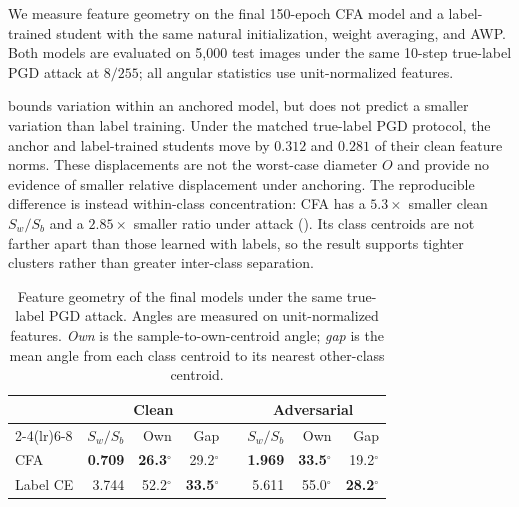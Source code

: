 \documentclass{article} %
\theoremstyle{plain}
\begin{document}
We measure feature geometry on the final 150-epoch CFA model and a label-trained student with the
same natural initialization, weight averaging, and AWP. Both models are evaluated on 5,000 test
images under the same 10-step true-label PGD attack at $8/255$; all angular statistics use
unit-normalized features.

 bounds variation within an anchored model, but does not predict a smaller
variation than label training. Under the matched true-label PGD protocol, the anchor and
label-trained students move by $0.312$ and $0.281$ of their clean feature norms. These
displacements are not the worst-case diameter $O$ and provide no evidence of smaller relative
displacement under anchoring. The reproducible difference is instead within-class concentration:
CFA has a $5.3\times$ smaller clean $S_w/S_b$ and a $2.85\times$ smaller ratio under attack
(). Its class centroids are not farther apart than those learned with labels,
so the result supports tighter clusters rather than greater inter-class separation.

\begin{table}[!htbp]
  \centering \small \setlength{\tabcolsep}{4pt}
  \caption{Feature geometry of the final models under the same true-label PGD attack. Angles are
  measured on unit-normalized features. \emph{Own} is the
  sample-to-own-centroid angle; \emph{gap} is the mean angle from each class centroid to its
  nearest other-class centroid.}
  \label{tab:anchorgeometry}
  \begin{tabular}{lrrrcrrr}
    \toprule
    & \multicolumn{3}{c}{Clean} & & \multicolumn{3}{c}{Adversarial} \\
    \cmidrule(lr){2-4}\cmidrule(lr){6-8}
    & $S_w/S_b$ & Own & Gap & & $S_w/S_b$ & Own & Gap \\
    \midrule
    CFA & \textbf{0.709} & \textbf{26.3$^\circ$} & 29.2$^\circ$ && \textbf{1.969} & \textbf{33.5$^\circ$} & 19.2$^\circ$ \\
    Label CE & 3.744 & 52.2$^\circ$ & \textbf{33.5$^\circ$} && 5.611 & 55.0$^\circ$ & \textbf{28.2$^\circ$} \\
    \bottomrule
  \end{tabular}
\end{table}

\end{document}
